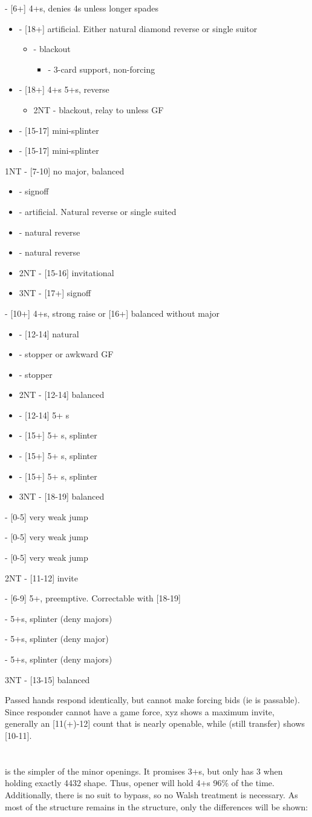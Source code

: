 \documentclass[12pt]{report}
\newcommand{\ul}[1]{\begin{itemize}#1\end{itemize}}
\newcommand{\li}{\item[~]}
\newcommand{\bidsection}[2]{\section{\texorpdfstring{#1}{#2}}}
\begin{document}
{{        }
        \li {} - [6+] 4+\sp{}s, denies 4\he{}s unless longer spades
        \ul {
            \li {} - [18+] artificial.  Either natural diamond reverse or single suitor
            \ul {
                \li \he2 - blackout
                \ul {
                    \li \sp2 - 3-card support, non-forcing
                }
            }
            \li \he2 - [18+] 4+\he{}s 5+\cl{}s, reverse
            \ul {
                \li 2NT - blackout, relay to \cl3 unless GF
            }
            \li \di3 - [15-17] mini-splinter
            \li \he3 - [15-17] mini-splinter
        }
        \li 1NT - [7-10] no major, balanced
        \ul {
            \li {} - signoff
            \li {} - artificial.  Natural reverse or single suited
            \li \he2 - natural reverse
            \li \sp2 - natural reverse
            \li 2NT - [15-16] invitational
            \li 3NT - [17+] signoff
            

        }
        \li {} - [10+] 4+\cl{}s, strong raise or [16+] balanced without major
        \ul {
            \li {} - [12-14] natural
            \li \he2 - stopper or awkward GF
            \li \sp2 - stopper
            \li 2NT - [12-14] balanced
            \li \cl3 - [12-14] 5+ \cl{}s
            \li \di3 - [15+] 5+ \cl{}s, splinter
            \li \he3 - [15+] 5+ \cl{}s, splinter
            \li \sp3 - [15+] 5+ \cl{}s, splinter
            \li 3NT - [18-19] balanced
        }

        \li {} - [0-5] very weak jump
        \li {} - [0-5] very weak jump
        \li {} - [0-5] very weak jump
        \li 2NT - [11-12] invite
        \li {} - [6-9] 5+\cl{}, preemptive.  Correctable with [18-19]
        \li {} - 5+\cl{}s, splinter (deny majors)
        \li {} - 5+\cl{}s, splinter (deny major)
        \li {} - 5+\cl{}s, splinter (deny majors)
        \li 3NT - [13-15] balanced
    }

    Passed hands respond identically, but cannot make forcing bids (ie  is passable).  Since responder cannot have a game force, xyz  shows a maximum invite, generally an [11(+)-12] count that is nearly openable, while  (still transfer) shows [10-11].

\bidsection{}{1♢} \label{2:3}

     is the simpler of the minor openings.  It promises 3+\di{}s, but only has 3 when holding exactly 4432 shape.  Thus, opener will hold 4+\di{}s 96\% of the time.  Additionally, there is no suit to bypass, so no Walsh treatment is necessary.  As most of the  structure remains in the  structure, only the differences will be shown:
\end{document}
